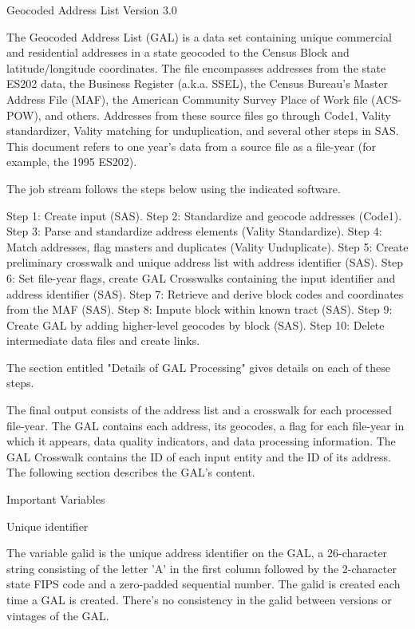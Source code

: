                Geocoded Address List Version 3.0


The Geocoded Address List (GAL) is a data set containing unique commercial and residential addresses
in a state geocoded to the Census Block and latitude/longitude coordinates. The file encompasses
addresses from the state ES202 data, the Business Register (a.k.a. SSEL), the Census Bureau's Master
Address File (MAF), the American Community Survey Place of Work file (ACS-POW), and others.
Addresses from these source files go through Code1, Vality standardizer, Vality matching for
unduplication, and several other steps in SAS. This document refers to one year's data from a source file
as a file-year (for example, the 1995 ES202). 

The job stream follows the steps below using the indicated software.

Step 1:   Create input (SAS).
Step 2:   Standardize and geocode addresses (Code1).
Step 3:   Parse and standardize address elements (Vality Standardize).
Step 4:   Match addresses, flag masters and duplicates (Vality Unduplicate).
Step 5:  Create preliminary crosswalk and unique address list with address identifier (SAS).
Step 6:   Set file-year flags, create GAL Crosswalks containing the input identifier and address identifier (SAS).
Step 7:   Retrieve and derive block codes and coordinates from the MAF (SAS).
Step 8:   Impute block within known tract (SAS).
Step 9:   Create GAL by adding higher-level geocodes by block (SAS). 
Step 10: Delete intermediate data files and create links. 

The section entitled "Details of GAL Processing" gives details on each of these steps. 

The final output consists of the address list and a crosswalk for each processed file-year. The GAL
contains each address, its geocodes, a flag for each file-year in which it appears, data quality indicators,
and data processing information. The GAL Crosswalk contains the ID of each input entity and the ID of
its address. The following section describes the GAL's content. 


                      Important Variables

Unique identifier

The variable galid is the unique address identifier on the GAL, a 26-character string consisting of the
letter 'A' in the first column followed by the 2-character state FIPS code and a zero-padded sequential
number. The galid is created each time a GAL is created. There's no consistency in the galid between
versions or vintages of the GAL.


